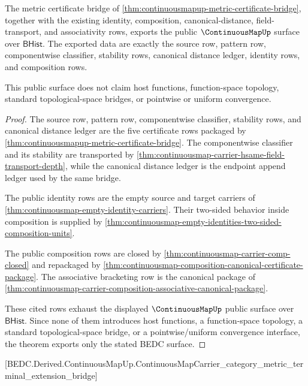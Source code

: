 \begin{theorem}
\label{thm:continuousmap-public-export-surface}
The metric certificate bridge of
\autoref{thm:continuousmapup-metric-certificate-bridge}, together with the
existing identity, composition, canonical-distance, field-transport, and
associativity rows, exports the public $\ContinuousMapUp$ surface over
$\mathsf{BHist}$. The exported data are exactly the source row, pattern row,
componentwise classifier, stability rows, canonical distance ledger, identity
rows, and composition rows.

This public surface does not claim host functions, function-space topology,
standard topological-space bridges, or pointwise or uniform convergence.
\end{theorem}
\begin{proof}
The source row, pattern row, componentwise classifier, stability rows, and
canonical distance ledger are the five certificate rows packaged by
\autoref{thm:continuousmapup-metric-certificate-bridge}. The componentwise
classifier and its stability are transported by
\autoref{thm:continuousmap-carrier-hsame-field-transport-depth}, while the
canonical distance ledger is the endpoint append ledger used by the same
bridge.

The public identity rows are the empty source and target carriers of
\autoref{thm:continuousmap-empty-identity-carriers}. Their two-sided behavior
inside composition is supplied by
\autoref{thm:continuousmap-empty-identities-two-sided-composition-units}.

The public composition rows are closed by
\autoref{thm:continuousmap-carrier-comp-closed} and repackaged by
\autoref{thm:continuousmap-composition-canonical-certificate-package}. The
associative bracketing row is the canonical package of
\autoref{thm:continuousmap-carrier-composition-associative-canonical-package}.

These cited rows exhaust the displayed $\ContinuousMapUp$ public surface over
$\mathsf{BHist}$. Since none of them introduces host functions, a
function-space topology, a standard topological-space bridge, or a
pointwise/uniform convergence interface, the theorem exports only the stated
BEDC surface.
\end{proof}

[BEDC.Derived.ContinuousMapUp.ContinuousMapCarrier\_category\_metric\_terminal\_extension\_bridge]

